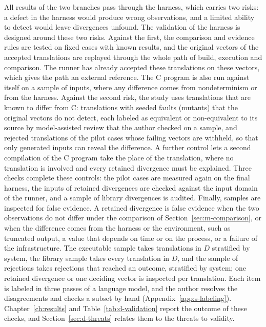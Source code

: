 All results of the two branches pass through the harness, which carries two risks: a defect in the harness would produce wrong observations, and a limited ability to detect would leave divergences unfound. The validation of the harness is designed around these two risks. Against the first, the comparison and evidence rules are tested on fixed cases with known results, and the original vectors of the accepted translations are replayed through the whole path of build, execution and comparison. The runner has already accepted these translations on these vectors, which gives the path an external reference. The C program is also run against itself on a sample of inputs, where any difference comes from nondeterminism or from the harness. Against the second risk, the study uses translations that are known to differ from C: translations with seeded faults (mutants) that the original vectors do not detect, each labeled as equivalent or non-equivalent to its source by model-assisted review that the author checked on a sample, and rejected translations of the pilot cases whose failing vectors are withheld, so that only generated inputs can reveal the difference. A further control lets a second compilation of the C program take the place of the translation, where no translation is involved and every retained divergence must be explained. Three checks complete these controls: the pilot cases are measured again on the final harness, the inputs of retained divergences are checked against the input domain of the runner, and a sample of library divergences is audited. Finally, samples are inspected for false evidence. A retained divergence is false evidence when the two observations do not differ under the comparison of Section~\ref{sec:m-comparison}, or when the difference comes from the harness or the environment, such as truncated output, a value that depends on time or on the process, or a failure of the infrastructure. The executable sample takes translations in $D$ stratified by system, the library sample takes every translation in $D$, and the sample of rejections takes rejections that reached an outcome, stratified by system; one retained divergence or one deciding vector is inspected per translation. Each item is labeled in three passes of a language model, and the author resolves the disagreements and checks a subset by hand (Appendix~\ref{app:s-labeling}). Chapter~\ref{ch:results} and Table~\ref{tab:d-validation} report the outcome of these checks, and Section~\ref{sec:d-threats} relates them to the threats to validity.

